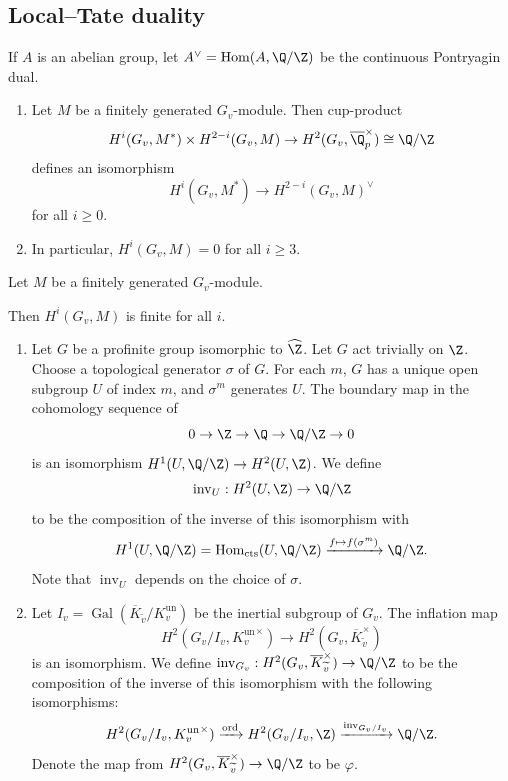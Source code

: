 \documentclass[11pt]{article}
\begin{document}
\subsection{Local--Tate duality}

If \( A \) is an abelian group, let \( A^\vee = \operatorname{Hom}(A,\Q/\Z) \) be the continuous Pontryagin dual.
\begin{thm}
    \begin{enumerate}[label=(\arabic*)]
        \item Let \( M \) be a finitely generated \( G_v \)-module. Then cup-product
        \[ H^i(G_v,M^*)\times H^{2-i}(G_v,M)\to H^2(G_v,\overline{\Q}_p^\times) \cong \Q/\Z \]
        defines an isomorphism
        \[ H^i(G_v,M^*)\to H^{2-i}(G_v,M)^\vee \]
        for all \( i\geq 0 \).
        \item In particular, \( H^i(G_v,M)=0 \) for all \( i\geq 3 \).
    \end{enumerate}
\end{thm}
\begin{thm}
    Let \( M \) be a finitely generated \( G_v \)-module.

    Then \( H^i(G_v,M) \) is finite for all \( i \).
\end{thm}
\begin{thm} \label{thm:cup-prod-duality}
    \begin{enumerate}[label=(\arabic*)]
        \item Let \( G \) be a profinite group isomorphic to \( \widehat{\Z} \). Let \( G \) act trivially on \( \Z \). Choose a topological generator \( \sigma \) of \( G \). For each \( m \), \( G \) has a unique open subgroup \( U \) of index \( m \), and \( \sigma^m \) generates \( U \). The boundary map in the cohomology sequence of
        \[ 0 \to \Z \to \Q \to \Q/\Z \to 0 \]
        is an isomorphism \( H^1(U,\Q/\Z)\to H^2(U,\Z) \). We define
        \[ \operatorname{inv}_U: H^2(U,\Z)\to \Q/\Z \]
        to be the composition of the inverse of this isomorphism with
        \[ H^1(U,\Q/\Z)=\operatorname{Hom}_{\operatorname{cts}}(U,\Q/\Z) \xrightarrow{f\mapsto f(\sigma^m)} \Q/\Z. \]
        Note that \( \operatorname{inv}_U \) depends on the choice of \( \sigma \).
        \item Let \( I_v = \operatorname{Gal}(\overline{K}_{\widetilde{v}}/K_v^{\operatorname{un}}) \) be the inertial subgroup of \( G_v \). The inflation map
        \[ H^2(G_v/I_v, {K_v^{\operatorname{un}}}^\times)\to H^2(G_v,\overline{K}_{\widetilde{v}}^\times) \]
        is an isomorphism. We define \( \operatorname{inv}_{G_v}: H^2(G_v,\overline{K}_{\widetilde{v}}^\times)\to \Q/\Z \) to be the composition of the inverse of this isomorphism with the following isomorphisms:
        \[ H^2(G_v/I_v,{K_v^{\operatorname{un}}}^\times)\xrightarrow{\operatorname{ord}} H^2(G_v/I_v,\Z) \xrightarrow{\operatorname{inv}_{G_v/I_v}} \Q/\Z. \]
        Denote the map from $H^2 (G_v, \overline{K}_{\widetilde{v}}^\times) \to \Q/\Z$ to be $\varphi$.
    \end{enumerate}
\end{thm}
\end{document}
